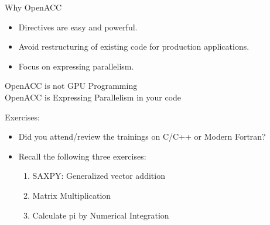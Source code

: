 \documentclass[c,mathserif,compress,xcolor=svgnames]{beamer}
\newenvironment{ablock}[0]
{
\begin{beamerboxesrounded}[upper=uppercol,lower=lowercol,shadow=true]}
{\end{beamerboxesrounded}}
\newenvironment{eblock}[0]
{
\begin{beamerboxesrounded}[upper=uppercol2,lower=lowercol2,shadow=true]}
{\end{beamerboxesrounded}}
\begin{document}
\begin{frame}{\small Why OpenACC}
  \begin{eblock}{}
    \begin{itemize}
      \item Directives are easy and powerful.
      \item Avoid restructuring of existing code for production applications.
      \item Focus on expressing parallelism.
    \end{itemize}
  \end{eblock}
  \vspace{1cm}
  \begin{ablock}{}
    \begin{center}
      \vspace{0.1cm}
      \Large{\color{red!80!black}OpenACC is not GPU Programming}\\
      \vspace{1cm}
      \Large{\color{red!80!black}OpenACC is Expressing Parallelism in your code}
    \end{center}
  \end{ablock}
\end{frame}

\begin{frame}{Exercises:}
  \begin{itemize}
    \item Did you attend/review the trainings on C/C++ or Modern Fortran?
    \item Recall the following three exercises:
    \begin{enumerate}
      \item SAXPY: Generalized vector addition
      \item Matrix Multiplication
      \item Calculate pi by Numerical Integration
    \end{enumerate}
  \end{itemize}
\end{frame}
\end{document}
